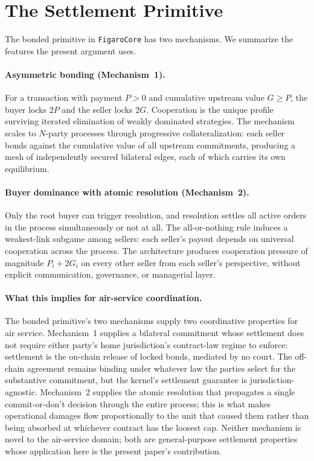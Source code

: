 \documentclass[11pt,a4paper]{article}
\theoremstyle{definition}
\theoremstyle{remark}
\newcommand{\pay}{P}
\newcommand{\cumval}{G}
\begin{document}
\section{The Settlement Primitive}
\label{sec:primitive}

The bonded primitive in \texttt{FigaroCore} has two mechanisms.
We summarize the features the present argument uses.

\paragraph{Asymmetric bonding (Mechanism~1).}
For a transaction with payment $\pay > 0$ and cumulative upstream
value $\cumval \geq \pay$, the buyer locks $2\pay$ and the seller
locks $2\cumval$. Cooperation is the unique profile surviving
iterated elimination of weakly dominated strategies. The
mechanism scales to $N$-party processes through progressive
collateralization: each seller bonds against the cumulative value
of all upstream commitments, producing a mesh of independently
secured bilateral edges, each of which carries its own
equilibrium.

\paragraph{Buyer dominance with atomic resolution (Mechanism~2).}
Only the root buyer can trigger resolution, and resolution
settles all active orders in the process simultaneously or not at
all. The all-or-nothing rule induces a weakest-link subgame among
sellers: each seller's payout depends on universal cooperation
across the process. The architecture produces cooperation
pressure of magnitude $\pay_i + 2\cumval_i$ on every other seller
from each seller's perspective, without explicit communication,
governance, or managerial layer.

\paragraph{What this implies for air-service coordination.}
The bonded primitive's two mechanisms supply two coordinative
properties for air service. Mechanism~1 supplies a bilateral
commitment whose settlement does not require either party's home
jurisdiction's contract-law regime to enforce: settlement is the
on-chain release of locked bonds, mediated by no court. The
off-chain agreement remains binding under whatever law the
parties select for the substantive commitment, but the kernel's
settlement guarantee is jurisdiction-agnostic. Mechanism~2
supplies the atomic resolution that propagates a single
commit-or-don't decision through the entire process; this is
what makes operational damages flow proportionally to the unit
that caused them rather than being absorbed at whichever contract
has the loosest cap. Neither mechanism is novel to the
air-service domain; both are general-purpose settlement
properties whose application here is the present paper's
contribution.
\end{document}
